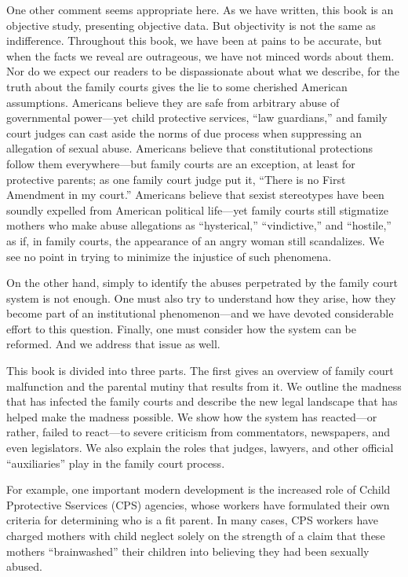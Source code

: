 One other comment seems appropriate here. As we have written, this book is an objective study, presenting objective data. But objectivity is not the same as indifference. Throughout this book, we have been at pains to be accurate, but when the facts we reveal are outrageous, we have not minced words about them. Nor do we expect our readers to be dispassionate about what we describe, for the truth about the family courts gives the lie to some cherished American assumptions. Americans believe they are safe from arbitrary abuse of governmental power—yet child protective services, “law guardians,” and family court judges can cast aside the norms of due process when suppressing an allegation of sexual abuse. Americans believe that constitutional protections follow them everywhere—but family courts are an exception, at least for protective parents; as one family court judge put it, “There is no First Amendment in my court.” Americans believe that sexist stereotypes have been soundly expelled from American political life—yet family courts still stigmatize mothers who make abuse allegations as “hysterical,” “vindictive,” and “hostile,” as if, in family courts, the appearance of an angry woman still scandalizes. We see no point in trying to minimize the injustice of such phenomena. \pfl{}


On the other hand, simply to identify the abuses perpetrated by the family court system is not enough. One must also try to understand how they arise, how they become part of an institutional phenomenon—and we have devoted considerable effort to this question. Finally, one must consider how the system can be reformed. And we address that issue as well. \pfl{}


This book is divided into three parts. The first gives an overview of family court malfunction and the parental mutiny that results from it. We outline the madness that has infected the family courts and describe the new legal landscape that has helped make the madness possible. We show how the system has reacted—or rather, failed to react—to severe criticism from commentators, newspapers, and even legislators. We also explain the roles that judges, lawyers, and other official “auxiliaries” play in the family court process. \pfl{}


For example, one important modern development is the increased role of Cchild Pprotective Sservices (CPS) agencies, whose workers have formulated their own criteria for determining who is a fit parent. In many cases, CPS workers have charged mothers with child neglect solely on the strength of a claim that these mothers “brainwashed” their children into believing they had been sexually abused. \pfl{}


